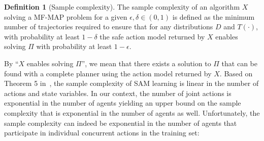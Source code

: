 \documentclass[letterpaper]{article} %
\theoremstyle{definition}
\newtheorem{definition}{Definition}
\theoremstyle{remark}
\newcommand{\mfmap}{\ac{MF-MAP}\xspace}
\begin{document}
\begin{definition}[Sample complexity]
The sample complexity of an algorithm $X$ solving a \mfmap problem for a given $\epsilon,\delta\in (0,1)$ is defined as the minimum number of trajectories required to ensure that for any distributions $D$ and $T(\cdot)$, with probability at least $1-\delta$ the safe action model returned by $X$ enables solving $\Pi$ with probability at least $1-\epsilon$.  
\end{definition}
By ``$X$ enables solving $\Pi$'', we mean that there exists a solution to $\Pi$ that can be found with a complete planner using the action model returned by $X$. 
Based on Theorem 5 in~\cite{juba2021safe}, the sample complexity of SAM learning is
linear in the number of actions and state variables. 
In our context, the number of joint actions is exponential in the number of agents yielding an  upper bound on the sample complexity that is exponential in the number of agents as well. 
Unfortunately, the sample complexity can indeed be exponential in the number of agents that participate in individual concurrent actions in the training set:

\end{document}

